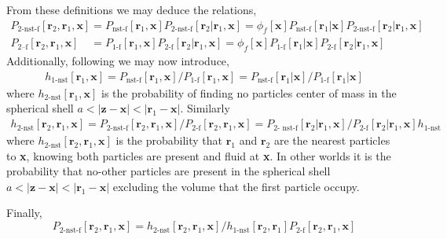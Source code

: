From these definitions we may deduce the relations, 
\begin{align}
    P_\text{2-nst-f}[\textbf{r}_2,\textbf{r}_1,\textbf{x}]
    &= 
    P_\text{nst-f}[\textbf{r}_1,\textbf{x}]
    P_\text{2-nst-f}[\textbf{r}_2|\textbf{r}_1,\textbf{x}]
    = 
    \phi_f[\textbf{x}]
    P_\text{nst-f}[\textbf{r}_1|\textbf{x}]
    P_\text{2-nst-f}[\textbf{r}_2|\textbf{r}_1,\textbf{x}]\\
    P_\text{2--f}[\textbf{r}_2,\textbf{r}_1,\textbf{x}]
    &= 
    P_\text{1-f}[\textbf{r}_1,\textbf{x}]
    P_\text{2-f}[\textbf{r}_2|\textbf{r}_1,\textbf{x}]
    = 
    \phi_f[\textbf{x}]
    P_\text{1-f}[\textbf{r}_1|\textbf{x}]
    P_\text{2-f}[\textbf{r}_2|\textbf{r}_1,\textbf{x}]
\end{align}
Additionally, following \citet{zhang2021ensemble} we may now introduce, 
\begin{align}
    h_\text{1-nst}[\textbf{r}_1, \textbf{x}]
    =
    P_\text{nst-f}[\textbf{r}_1 , \textbf{x}] / P_\text{1-f}[\textbf{r}_1 ,\textbf{x}]
    = 
    P_\text{nst-f}[\textbf{r}_1 | \textbf{x}] /P_\text{1-f}[\textbf{r}_1 |\textbf{x}]
\end{align}
where $h_\text{2-nst}[\textbf{r}_1, \textbf{x}]$ is the probability of finding no particles center of mass in the spherical shell $a < |\textbf{z} - \textbf{x}| < |\textbf{r}_1 - \textbf{x}|$. 
Similarly
\begin{align}
    h_\text{2-nst}[\textbf{r}_2,\textbf{r}_1, \textbf{x}]
    =
    P_\text{2-nst-f}[\textbf{r}_2 ,\textbf{r}_1 , \textbf{x}] / P_\text{2-f}[\textbf{r}_2 ,\textbf{r}_1 ,\textbf{x}]
    =
    P_\text{2- nst-f}[\textbf{r}_2 |\textbf{r}_1 , \textbf{x}] 
    / 
    P_\text{2-f}[\textbf{r}_2 |\textbf{r}_1 ,\textbf{x}]
    h_\text{1-nst}
\end{align}
where $h_\text{2-nst}[\textbf{r}_2,\textbf{r}_1, \textbf{x}]$ is the probability that $\textbf{r}_1$ and $\textbf{r}_2$ are the nearest particles to \textbf{x}, knowing both particles are present and fluid at \textbf{x}. 
In other worlds it is the probability that no-other particles are present in the spherical shell $a < |\textbf{z} - \textbf{x}| < |\textbf{r}_1 - \textbf{x}|$ excluding the volume that the first particle occupy. 

Finally, 
\begin{equation}
    P_\text{2-nst-f}[\textbf{r}_2 ,\textbf{r}_1 , \textbf{x}] 
    =
    h_\text{2-nst}[\textbf{r}_2,\textbf{r}_1, \textbf{x}] 
    / h_\text{1-nst}[\textbf{r}_2,\textbf{r}_1 ]
    P_\text{2-f}[\textbf{r}_2 ,\textbf{r}_1 ,\textbf{x}]
\end{equation}
